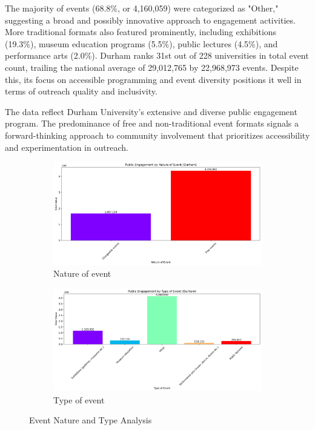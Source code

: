\documentclass[journal,onecolumn, 10pt,draftclsnofoot]{IEEEtran}
\begin{document}
The majority of events (68.8\%, or 4,160,059) were categorized as "Other," suggesting a broad and possibly innovative approach to engagement activities. More traditional formats also featured prominently, including exhibitions (19.3\%), museum education programs (5.5\%), public lectures (4.5\%), and performance arts (2.0\%). Durham ranks 31st out of 228 universities in total event count, trailing the national average of 29,012,765 by 22,968,973 events. Despite this, its focus on accessible programming and event diversity positions it well in terms of outreach quality and inclusivity.

The data reflect Durham University's extensive and diverse public engagement program. The predominance of free and non-traditional event formats signals a forward-thinking approach to community involvement that prioritizes accessibility and experimentation in outreach.

\begin{figure}[h]
\centering
\begin{subfigure}[b]{0.48\textwidth}
    \centering
    \includegraphics[width=\textwidth]{Fig/figure30.nature_of_event.png}
    \caption{Nature of event}
    \label{fig:nature-of-event}
\end{subfigure}
\hfill
\begin{subfigure}[b]{0.48\textwidth}
    \centering
    \includegraphics[width=\textwidth]{Fig/figure31.type_of_event.png}
    \caption{Type of event}
    \label{fig:type-of-event}
\end{subfigure}
\vspace{0.6cm}
\caption{Event Nature and Type Analysis}
\label{fig:event-analysis}
\end{figure}
\end{document}
